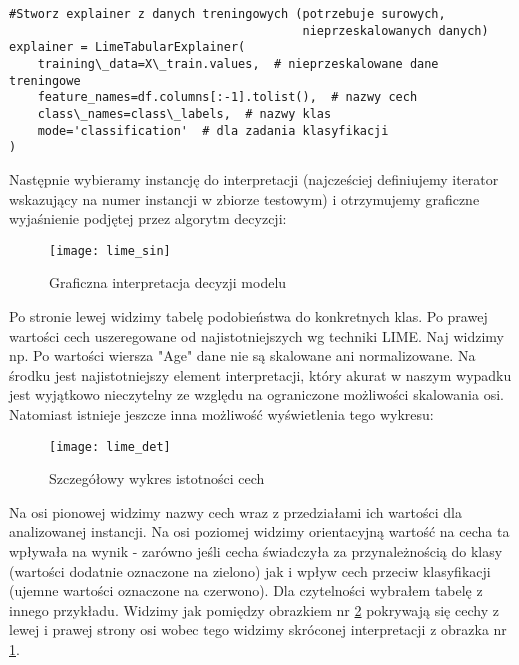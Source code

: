 \begin{lstlisting}[caption=Definicja explainera]
#Stworz explainer z danych treningowych (potrzebuje surowych, 
                                         nieprzeskalowanych danych)
explainer = LimeTabularExplainer(
    training\_data=X\_train.values,  # nieprzeskalowane dane treningowe
    feature_names=df.columns[:-1].tolist(),  # nazwy cech
    class\_names=class\_labels,  # nazwy klas
    mode='classification'  # dla zadania klasyfikacji
)
\end{lstlisting}

Następnie wybieramy instancję do interpretacji (najcześciej definiujemy iterator wskazujący na numer instancji w zbiorze testowym) i otrzymujemy graficzne wyjaśnienie podjętej przez algorytm decyzcji:\\

\begin{figure}[H]
    \centering
    \texttt{[image: lime\_sin]}
    \caption{Graficzna interpretacja decyzji modelu}
    \label{fig:lime_sin}
\end{figure}

Po stronie lewej widzimy tabelę podobieństwa do konkretnych klas. Po prawej wartości cech uszeregowane od najistotniejszych wg techniki LIME. Naj widzimy np. Po wartości wiersza "Age" dane nie są skalowane ani normalizowane. Na środku jest najistotniejszy element interpretacji, który akurat w naszym wypadku jest wyjątkowo nieczytelny ze względu na ograniczone możliwości skalowania osi. Natomiast istnieje jeszcze inna możliwość wyświetlenia tego wykresu:\\

\begin{figure}[H]
    \centering
    \texttt{[image: lime\_det]}
    \caption{Szczegółowy wykres istotności cech}
    \label{fig:lime_det}
\end{figure}

Na osi pionowej widzimy nazwy cech wraz z przedziałami ich wartości dla analizowanej instancji. Na osi poziomej widzimy orientacyjną wartość na cecha ta wpływała na wynik - zarówno jeśli cecha świadczyła za przynależnością do klasy (wartości dodatnie oznaczone na zielono) jak i wpływ cech przeciw klasyfikacji (ujemne wartości oznaczone na czerwono). Dla czytelności wybrałem tabelę z innego przykładu. Widzimy jak pomiędzy obrazkiem nr \ref{fig:lime_det} pokrywają się cechy z lewej i prawej strony osi wobec tego widzimy skróconej interpretacji z obrazka nr \ref{fig:lime_sin}.

